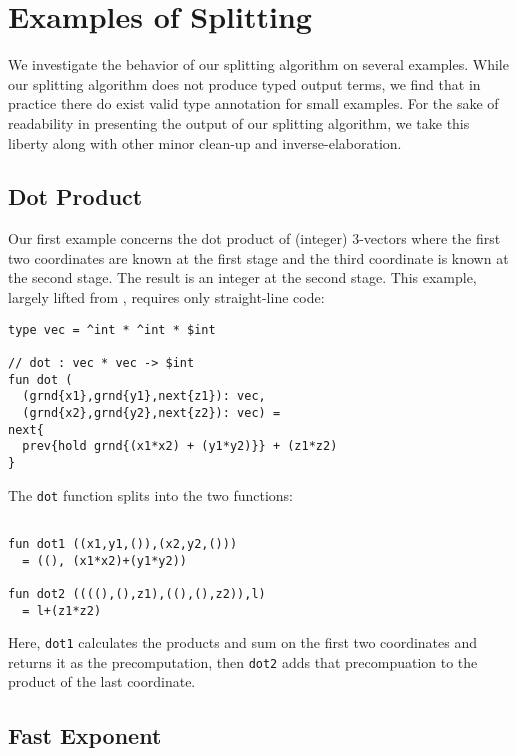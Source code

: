  \section{Examples of Splitting}
\label{sec:examples}

We investigate the behavior of our splitting algorithm on several examples.
While our splitting algorithm does not produce typed output terms,
we find that in practice there do exist valid type annotation for small examples.
For the sake of readability in presenting the output of our splitting algorithm,
we take this liberty along with other minor clean-up and inverse-elaboration.

\subsection{Dot Product}

Our first example concerns the dot product of (integer) 3-vectors where 
the first two coordinates are known at the first stage and the 
third coordinate is known at the second stage.
The result is an integer at the second stage.
This example, largely lifted from \cite{knoblock96}, requires only straight-line code:
\begin{lstlisting} 
type vec = ^int * ^int * $int

// dot : vec * vec -> $int
fun dot (
  (grnd{x1},grnd{y1},next{z1}): vec, 
  (grnd{x2},grnd{y2},next{z2}): vec) = 
next{
  prev{hold grnd{(x1*x2) + (y1*y2)}} + (z1*z2)
}
\end{lstlisting}
The \texttt{dot} function splits into the two functions:
\begin{lstlisting} 

fun dot1 ((x1,y1,()),(x2,y2,())) 
  = ((), (x1*x2)+(y1*y2))

fun dot2 ((((),(),z1),((),(),z2)),l) 
  = l+(z1*z2)
\end{lstlisting}
Here, \texttt{dot1} calculates the products and sum on the first two coordinates and returns it as the precomputation,
then \texttt{dot2} adds that precompuation to the product of the last coordinate.

\subsection{Fast Exponent}

